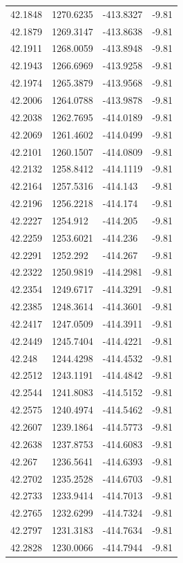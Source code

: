 \begin{table}[H]
\begin{tabular}{llll}
42.1848 & 1270.6235 & -413.8327 & -9.81 \\
42.1879 & 1269.3147 & -413.8638 & -9.81 \\
42.1911 & 1268.0059 & -413.8948 & -9.81 \\
42.1943 & 1266.6969 & -413.9258 & -9.81 \\
42.1974 & 1265.3879 & -413.9568 & -9.81 \\
42.2006 & 1264.0788 & -413.9878 & -9.81 \\
42.2038 & 1262.7695 & -414.0189 & -9.81 \\
42.2069 & 1261.4602 & -414.0499 & -9.81 \\
42.2101 & 1260.1507 & -414.0809 & -9.81 \\
42.2132 & 1258.8412 & -414.1119 & -9.81 \\
42.2164 & 1257.5316 & -414.143 & -9.81 \\
42.2196 & 1256.2218 & -414.174 & -9.81 \\
42.2227 & 1254.912 & -414.205 & -9.81 \\
42.2259 & 1253.6021 & -414.236 & -9.81 \\
42.2291 & 1252.292 & -414.267 & -9.81 \\
42.2322 & 1250.9819 & -414.2981 & -9.81 \\
42.2354 & 1249.6717 & -414.3291 & -9.81 \\
42.2385 & 1248.3614 & -414.3601 & -9.81 \\
42.2417 & 1247.0509 & -414.3911 & -9.81 \\
42.2449 & 1245.7404 & -414.4221 & -9.81 \\
42.248 & 1244.4298 & -414.4532 & -9.81 \\
42.2512 & 1243.1191 & -414.4842 & -9.81 \\
42.2544 & 1241.8083 & -414.5152 & -9.81 \\
42.2575 & 1240.4974 & -414.5462 & -9.81 \\
42.2607 & 1239.1864 & -414.5773 & -9.81 \\
42.2638 & 1237.8753 & -414.6083 & -9.81 \\
42.267 & 1236.5641 & -414.6393 & -9.81 \\
42.2702 & 1235.2528 & -414.6703 & -9.81 \\
42.2733 & 1233.9414 & -414.7013 & -9.81 \\
42.2765 & 1232.6299 & -414.7324 & -9.81 \\
42.2797 & 1231.3183 & -414.7634 & -9.81 \\
42.2828 & 1230.0066 & -414.7944 & -9.81 \\

\end{tabular}
\end{table}
